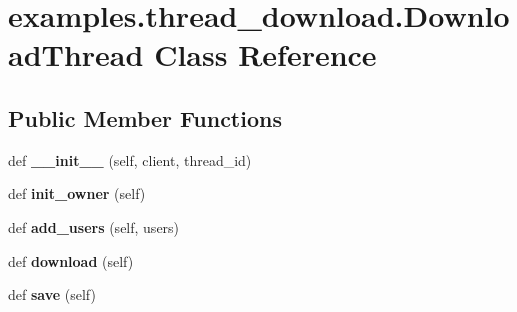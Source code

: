 \hypertarget{classexamples_1_1thread__download_1_1_download_thread}{}\section{examples.\+thread\+\_\+download.\+Download\+Thread Class Reference}
\label{classexamples_1_1thread__download_1_1_download_thread}
\subsection*{Public Member Functions}
\begin{DoxyCompactItemize}
\item 
\mbox{\label{classexamples_1_1thread__download_1_1_download_thread_acfe4424624735a656572303ba0fef5f6}} 
def {\bfseries \+\_\+\+\_\+init\+\_\+\+\_\+} (self, client, thread\+\_\+id)
\item 
\mbox{\label{classexamples_1_1thread__download_1_1_download_thread_a852515ec9bae553a9d202d450017d8be}} 
def {\bfseries init\+\_\+owner} (self)
\item 
\mbox{\label{classexamples_1_1thread__download_1_1_download_thread_aee428584527ecb1f2b05fb8ecf9f3045}} 
def {\bfseries add\+\_\+users} (self, users)
\item 
\mbox{\label{classexamples_1_1thread__download_1_1_download_thread_a86be6845711df8d2418b0c5cc7873fcb}} 
def {\bfseries download} (self)
\item 
\mbox{\label{classexamples_1_1thread__download_1_1_download_thread_a906790b06f2b2038dadeb4f2826fe891}} 
def {\bfseries save} (self)
\end{DoxyCompactItemize}
